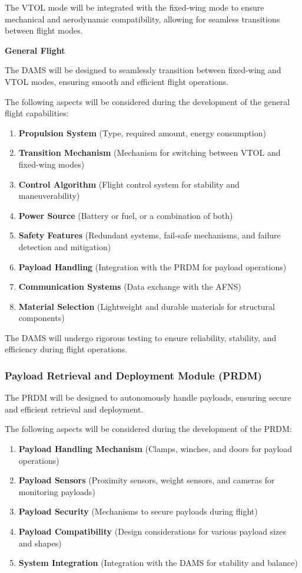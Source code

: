 \documentclass[12pt]{article}
\begin{document}
The VTOL mode will be integrated with the fixed-wing mode to ensure mechanical and aerodynamic compatibility, allowing for seamless transitions between flight modes.

\textbf{General Flight}

The DAMS will be designed to seamlessly transition between fixed-wing and VTOL modes, ensuring smooth and efficient flight operations.

The following aspects will be considered during the development of the general flight capabilities:
\begin{enumerate}
    \item \textbf{Propulsion System} (Type, required amount, energy consumption)
    \item \textbf{Transition Mechanism} (Mechanism for switching between VTOL and fixed-wing modes)
    \item \textbf{Control Algorithm} (Flight control system for stability and maneuverability)
    \item \textbf{Power Source} (Battery or fuel, or a combination of both)
    \item \textbf{Safety Features} (Redundant systems, fail-safe mechanisms, and failure detection and mitigation)
    \item \textbf{Payload Handling} (Integration with the PRDM for payload operations)
    \item \textbf{Communication Systems} (Data exchange with the AFNS)
    \item \textbf{Material Selection} (Lightweight and durable materials for structural components)
\end{enumerate}

The DAMS will undergo rigorous testing to ensure reliability, stability, and efficiency during flight operations.

\subsubsection{Payload Retrieval and Deployment Module (PRDM)}
The PRDM will be designed to autonomously handle payloads, ensuring secure and efficient retrieval and deployment.

The following aspects will be considered during the development of the PRDM:
\begin{enumerate}
    \item \textbf{Payload Handling Mechanism} (Clamps, winches, and doors for payload operations)
    \item \textbf{Payload Sensors} (Proximity sensors, weight sensors, and cameras for monitoring payloads)
    \item \textbf{Payload Security} (Mechanisms to secure payloads during flight)
    \item \textbf{Payload Compatibility} (Design considerations for various payload sizes and shapes)
    \item \textbf{System Integration} (Integration with the DAMS for stability and balance)
\end{enumerate}
\end{document}
